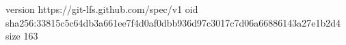 version https://git-lfs.github.com/spec/v1
oid sha256:33815c5c64db3a661ee7f4d0af0dbb936d97c3017c7d06a66886143a27e1b2d4
size 163
